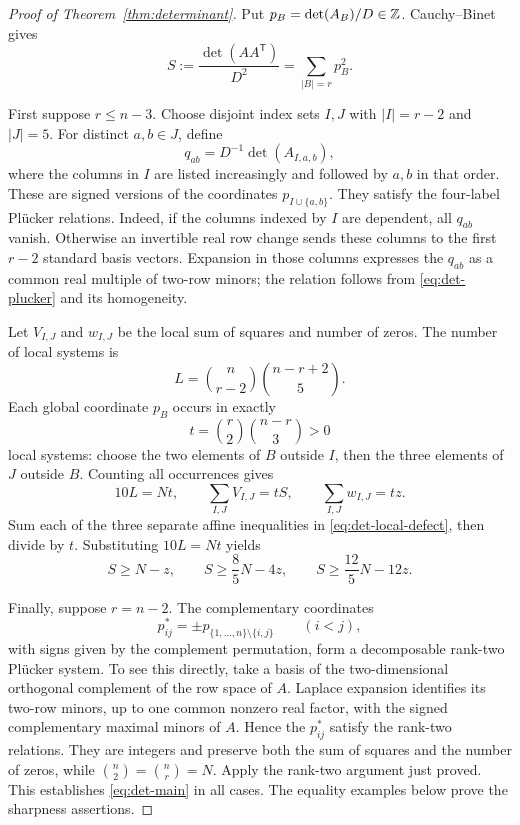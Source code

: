 \begin{proof}[Proof of Theorem~\ref{thm:determinant}]
Put $p_B=\det(A_B)/D\in\mathbb Z$. Cauchy--Binet gives
\begin{equation}
 S:=\frac{\det(AA^{\mathsf T})}{D^2}
   =\sum_{|B|=r}p_B^2.
 \label{eq:det-cb}
\end{equation}

First suppose $r\le n-3$. Choose disjoint index sets $I,J$ with
$|I|=r-2$ and $|J|=5$. For distinct $a,b\in J$, define
\[
 q_{ab}=D^{-1}\det(A_{I,a,b}),
\]
where the columns in $I$ are listed increasingly and followed by
$a,b$ in that order. These are signed versions of the coordinates
$p_{I\cup\{a,b\}}$. They satisfy the four-label Pl\"ucker relations.
Indeed, if the columns indexed by $I$ are dependent, all $q_{ab}$
vanish. Otherwise an invertible real row change sends these columns
to the first $r-2$ standard basis vectors. Expansion in those columns
expresses the $q_{ab}$ as a common real multiple of two-row minors;
the relation follows from \eqref{eq:det-plucker} and its homogeneity.

Let $V_{I,J}$ and $w_{I,J}$ be the local sum of squares and number of
zeros. The number of local systems is
\[
 L=\binom n{r-2}\binom{n-r+2}{5}.
\]
Each global coordinate $p_B$ occurs in exactly
\[
 t=\binom r2\binom{n-r}{3}>0
\]
local systems: choose the two elements of $B$ outside $I$, then the
three elements of $J$ outside $B$. Counting all occurrences gives
\[
 10L=Nt,\qquad
 \sum_{I,J}V_{I,J}=tS,\qquad
 \sum_{I,J}w_{I,J}=tz.
\]
Sum each of the three separate affine inequalities in
\eqref{eq:det-local-defect}, then divide by $t$. Substituting
$10L=Nt$ yields
\[
 S\ge N-z,\qquad
 S\ge\frac85N-4z,\qquad
 S\ge\frac{12}5N-12z.
\]

Finally, suppose $r=n-2$. The complementary coordinates
\[
 p^*_{ij}=\pm p_{\{1,\ldots,n\}\setminus\{i,j\}}
 \qquad(i<j),
\]
with signs given by the complement permutation, form a decomposable
rank-two Pl\"ucker system. To see this directly, take a basis of the
two-dimensional orthogonal complement of the row space of $A$.
Laplace expansion identifies its two-row minors, up to one common
nonzero real factor, with the signed complementary maximal minors
of $A$. Hence the $p^*_{ij}$ satisfy the rank-two relations. They
are integers and preserve both the sum of squares and the number
of zeros, while $\binom n2=\binom nr=N$. Apply the rank-two argument
just proved. This establishes \eqref{eq:det-main} in all cases.
The equality examples below prove the sharpness assertions.
\end{proof}


